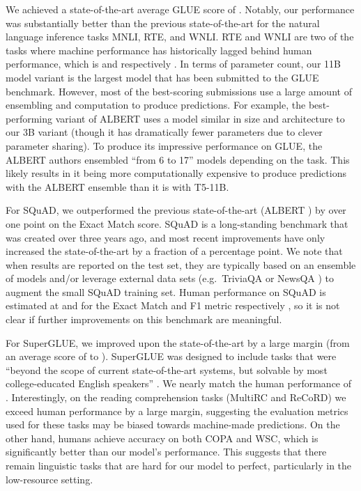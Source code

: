 \documentclass[twoside,11pt]{article}
\begin{document}
We achieved a state-of-the-art average GLUE score of .
Notably, our performance was substantially better than the previous state-of-the-art for the natural language inference tasks MNLI, RTE, and WNLI.
RTE and WNLI are two of the tasks where machine performance has historically lagged behind human performance, which is  and  respectively \citep{wang2018glue}.
In terms of parameter count, our 11B model variant is the largest model that has been submitted to the GLUE benchmark.
However, most of the best-scoring submissions use a large amount of ensembling and computation to produce predictions.
For example, the best-performing variant of ALBERT \citep{lan2019albert} uses a model similar in size and architecture to our 3B variant (though it has dramatically fewer parameters due to clever parameter sharing).
To produce its impressive performance on GLUE, the ALBERT authors ensembled ``from 6 to 17'' models depending on the task.
This likely results in it being more computationally expensive to produce predictions with the ALBERT ensemble than it is with T5-11B.

For SQuAD, we outperformed the previous state-of-the-art (ALBERT \citep{lan2019albert}) by over one point on the Exact Match score.
SQuAD is a long-standing benchmark that was created over three years ago, and most recent improvements have only increased the state-of-the-art by a fraction of a percentage point.
We note that when results are reported on the test set, they are typically based on an ensemble of models and/or leverage external data sets (e.g.\ TriviaQA \citep{joshi2017triviaqa} or NewsQA \citep{trischler2016newsqa}) to augment the small SQuAD training set.
Human performance on SQuAD is estimated at  and  for the Exact Match and F1 metric respectively \citep{rajpurkar2016squad}, so it is not clear if further improvements on this benchmark are meaningful.

For SuperGLUE, we improved upon the state-of-the-art by a large margin (from an average score of  \citep{liu2019roberta} to ).
SuperGLUE was designed to include tasks that were ``beyond the scope of current state-of-the-art systems, but solvable by most college-educated English speakers'' \citep{wang2019superglue}.
We nearly match the human performance of  \citep{wang2019superglue}.
Interestingly, on the reading comprehension tasks (MultiRC and ReCoRD) we exceed human performance by a large margin, suggesting the evaluation metrics used for these tasks may be biased towards machine-made predictions.
On the other hand, humans achieve  accuracy on both COPA and WSC, which is significantly better than our model's performance.
This suggests that there remain linguistic tasks that are hard for our model to perfect, particularly in the low-resource setting.
\end{document}
